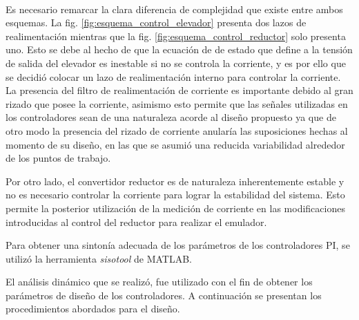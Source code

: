 \begin{figure}
 \centering
  \\
\end{figure}

Es necesario remarcar la clara diferencia de complejidad que existe entre ambos esquemas. La fig. \ref{fig:esquema_control_elevador} presenta dos lazos de realimentación
mientras que la fig. \ref{fig:esquema_control_reductor} solo presenta uno. Esto se debe al hecho de que la ecuación de de estado que define a la tensión de salida del
elevador es inestable si no se controla la corriente, y es por ello que se decidió colocar un lazo de realimentación interno para controlar la corriente. La presencia
del filtro de realimentación de corriente es importante debido al gran rizado que posee la corriente, asimismo esto permite que las señales utilizadas en los controladores
sean de una naturaleza acorde al diseño propuesto ya que de otro modo la presencia del rizado de corriente anularía las suposiciones hechas al momento de su diseño, en las
que se asumió una reducida variabilidad alrededor de los puntos de trabajo.

Por otro lado, el convertidor reductor es de naturaleza inherentemente estable y no es necesario controlar la corriente para lograr la estabilidad del sistema. Esto permite
la posterior utilización de la medición de corriente en las modificaciones introducidas al control del reductor para realizar el emulador.

Para obtener una sintonía adecuada de los parámetros de los controladores PI, se utilizó la herramienta \emph{sisotool} de MATLAB.

El análisis dinámico que se realizó, fue utilizado con el fin de obtener los parámetros de diseño de los controladores. A continuación se presentan los procedimientos
abordados para el diseño.

